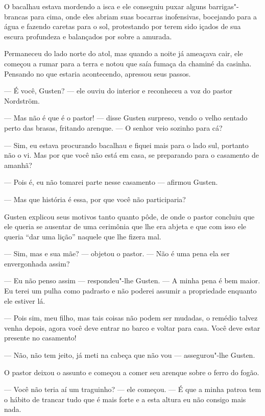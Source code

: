  O bacalhau estava mordendo a isca e ele conseguiu puxar alguns
 barrigas"-brancas para cima, onde eles abriam suas bocarras inofensivas,
 bocejando para a água e fazendo caretas para o sol, protestando por terem sido
 içados de sua escura profundeza e balançados por sobre a amurada. 
 
 Permaneceu do lado norte do atol, mas quando a noite já ameaçava cair, ele começou a
 rumar para a terra e notou que saía fumaça da chaminé da casinha. Pensando no
 que estaria acontecendo, apressou seus passos.

--- É você, Gusten? --- ele ouviu do interior e reconheceu a voz do pastor Nordström. 

--- Mas não é que é o pastor! --- disse Gusten surpreso, vendo o velho sentado perto das brasas,
fritando arenque. --- O senhor veio sozinho para cá?

--- Sim, eu estava procurando bacalhau e fiquei mais para o lado sul, portanto
não o vi. Mas por que você não está em casa, se preparando para o casamento de
amanhã?

--- Pois é, eu não tomarei parte nesse casamento --- afirmou Gusten.

 --- Mas que história é essa, por que você não participaria? 
 
 Gusten explicou seus motivos tanto quanto pôde, de onde o pastor concluiu que ele 
 queria se ausentar de uma  cerimônia que lhe era abjeta e que com isso ele queria 
 ``dar uma lição'' naquele que lhe fizera mal.

--- Sim, mas e sua mãe? --- objetou o pastor. --- Não é uma pena ela ser
envergonhada assim?

--- Eu não penso assim --- respondeu"-lhe Gusten. --- A minha pena é bem maior. Eu
terei um pulha como padrasto e não poderei assumir a propriedade enquanto ele
estiver lá.

--- Pois sim, meu filho, mas tais coisas não podem ser mudadas, o remédio talvez
venha depois, agora você deve entrar no barco e voltar para casa. Você deve
estar presente no casamento!

--- Não, não tem jeito, já meti na cabeça que não vou --- assegurou"-lhe Gusten.

O pastor deixou o assunto e começou a comer seu arenque sobre o ferro do fogão.

--- Você não teria aí um traguinho? --- ele começou. --- É que a minha patroa tem
o hábito de trancar tudo que é mais forte e a esta altura eu não consigo mais
nada.

